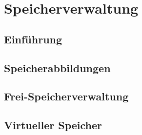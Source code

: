 \section{Speicherverwaltung}

\subsection{Einführung}

\subsection{Speicherabbildungen}

\subsection{Frei-Speicherverwaltung}

\subsection{Virtueller Speicher}

